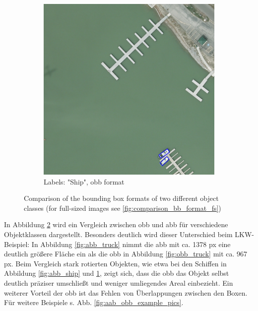 \begin{figure}[h]
\begin{subfigure}[b]{0.45\textwidth}
        \includegraphics[trim={680pt 50pt 250pt 865pt},clip,width=\textwidth]{images/015Results/01abb_vs_obb/obb_ship.png}
        \caption{Labels: "Ship", obb format}
        \label{fig:obb_ship}
    \end{subfigure}  
    \caption[Comparison of the bounding box formats of two different object classes]{Comparison of the bounding box formats of two different object classes (for full-sized images see \ref{fig:comparison_bb_format_fs})}
    \label{fig:comparison_bb_format}
\end{figure}


In Abbildung \ref{fig:comparison_bb_format} wird ein Vergleich zwischen \acrshort{obb} und \acrshort{abb} für verschiedene Objektklassen dargestellt. Besonders deutlich wird dieser Unterschied beim LKW-Beispiel: In Abbildung \ref{fig:abb_truck} nimmt die \acrshort{abb} mit ca. 1378 px eine deutlich größere Fläche ein als die \acrshort{obb} in Abbildung \ref{fig:obb_truck} mit ca. 967 px. Beim Vergleich stark rotierten Objekten, wie etwa bei den Schiffen in Abbildung \ref{fig:abb_ship} und \ref{fig:obb_ship}, zeigt sich, dass die \acrshort{obb} das Objekt selbst deutlich präziser umschließt und weniger umliegendes Areal einbezieht. Ein weiterer Vorteil der \acrshort{obb} ist das Fehlen von Überlappungen zwischen den Boxen. Für weitere Beispiele s. Abb. \ref{fig:aab_obb_example_pics}.

